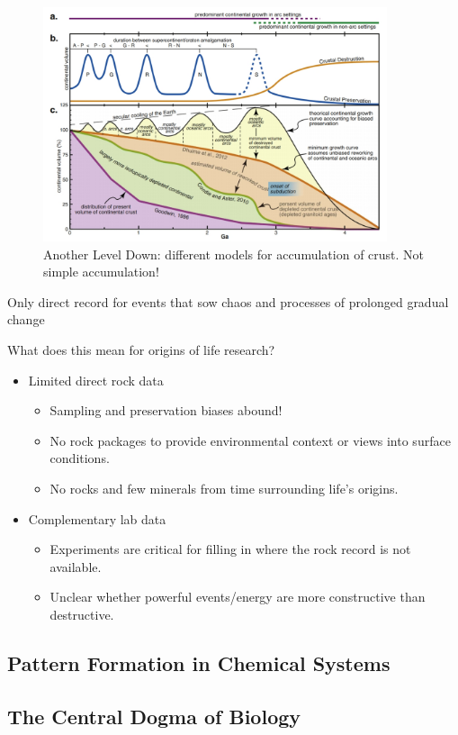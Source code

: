 \documentclass[]{article}
\begin{document}
\begin{figure}[H]
	\caption{Another Level Down: different models for accumulation of crust. Not simple accumulation!}\label{fig:AnotherLevelDown} 
	\includegraphics[width=0.9\textwidth]{AnotherLevelDown}
\end{figure}

Only direct record for events
that sow chaos and processes of prolonged
gradual change

What does this mean for
origins of life research?
\begin{itemize}
	\item Limited direct rock data
	\begin{itemize}
		\item 	Sampling and preservation
		biases abound!
			\item No rock packages to
		provide environmental
		context or views into surface
		conditions.
		\item 	No rocks and few minerals
		from time surrounding life’s
		origins.
	\end{itemize}
	\item Complementary lab data
	\begin{itemize}
		\item Experiments are critical for
		filling in where the rock
		record is not available.
			\item Unclear whether powerful
		events/energy are more
		constructive than destructive.
	\end{itemize}
\end{itemize}
\subsection{Pattern Formation in Chemical Systems}
\subsection{The Central Dogma of Biology}
\cite{crick1958biological} \cite{crick1970central}
\end{document}
